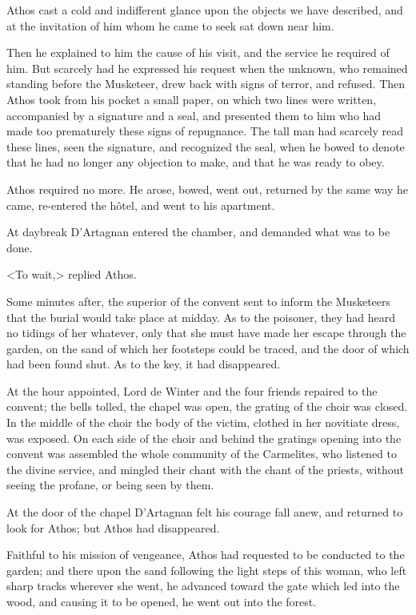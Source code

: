 Athos cast a cold and indifferent glance upon the objects we have described, and at the invitation of him whom he came to seek sat down near him. 

Then he explained to him the cause of his visit, and the service he required of him. But scarcely had he expressed his request when the unknown, who remained standing before the Musketeer, drew back with signs of terror, and refused. Then Athos took from his pocket a small paper, on which two lines were written, accompanied by a signature and a seal, and presented them to him who had made too prematurely these signs of repugnance. The tall man had scarcely read these lines, seen the signature, and recognized the seal, when he bowed to denote that he had no longer any objection to make, and that he was ready to obey. 

Athos required no more. He arose, bowed, went out, returned by the same way he came, re-entered the hôtel, and went to his apartment. 

At daybreak D'Artagnan entered the chamber, and demanded what was to be done. 

<To wait,> replied Athos. 

Some minutes after, the superior of the convent sent to inform the Musketeers that the burial would take place at midday. As to the poisoner, they had heard no tidings of her whatever, only that she must have made her escape through the garden, on the sand of which her footsteps could be traced, and the door of which had been found shut. As to the key, it had disappeared. 

At the hour appointed, Lord de Winter and the four friends repaired to the convent; the bells tolled, the chapel was open, the grating of the choir was closed. In the middle of the choir the body of the victim, clothed in her novitiate dress, was exposed. On each side of the choir and behind the gratings opening into the convent was assembled the whole community of the Carmelites, who listened to the divine service, and mingled their chant with the chant of the priests, without seeing the profane, or being seen by them. 

At the door of the chapel D'Artagnan felt his courage fall anew, and returned to look for Athos; but Athos had disappeared. 

Faithful to his mission of vengeance, Athos had requested to be conducted to the garden; and there upon the sand following the light steps of this woman, who left sharp tracks wherever she went, he advanced toward the gate which led into the wood, and causing it to be opened, he went out into the forest. 


